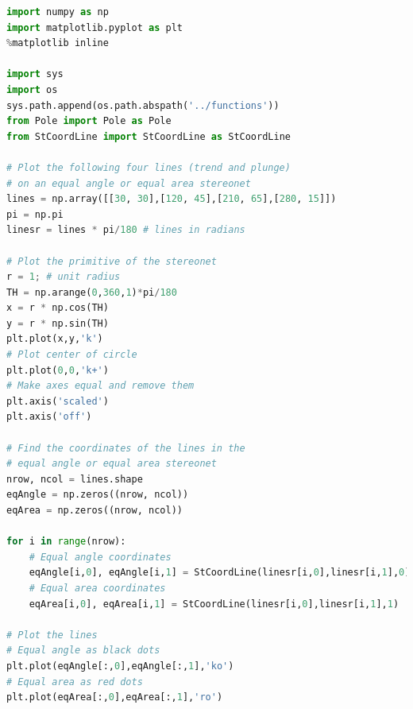 \documentclass[a4paper , 12pt]{book}
\begin{document}
\begin{center}
\begin{lstlisting}[language=Python, frame=single]
import numpy as np
import matplotlib.pyplot as plt
%matplotlib inline

import sys
import os
sys.path.append(os.path.abspath('../functions'))
from Pole import Pole as Pole
from StCoordLine import StCoordLine as StCoordLine

# Plot the following four lines (trend and plunge)
# on an equal angle or equal area stereonet
lines = np.array([[30, 30],[120, 45],[210, 65],[280, 15]])
pi = np.pi
linesr = lines * pi/180 # lines in radians

# Plot the primitive of the stereonet
r = 1; # unit radius
TH = np.arange(0,360,1)*pi/180
x = r * np.cos(TH)
y = r * np.sin(TH)
plt.plot(x,y,'k')
# Plot center of circle
plt.plot(0,0,'k+')
# Make axes equal and remove them
plt.axis('scaled')
plt.axis('off')

# Find the coordinates of the lines in the
# equal angle or equal area stereonet
nrow, ncol = lines.shape
eqAngle = np.zeros((nrow, ncol))
eqArea = np.zeros((nrow, ncol))

for i in range(nrow):
    # Equal angle coordinates
    eqAngle[i,0], eqAngle[i,1] = StCoordLine(linesr[i,0],linesr[i,1],0) 
    # Equal area coordinates
    eqArea[i,0], eqArea[i,1] = StCoordLine(linesr[i,0],linesr[i,1],1)
    
# Plot the lines
# Equal angle as black dots
plt.plot(eqAngle[:,0],eqAngle[:,1],'ko')
# Equal area as red dots
plt.plot(eqArea[:,0],eqArea[:,1],'ro')
\end{lstlisting}
\end{center}
\end{document}
